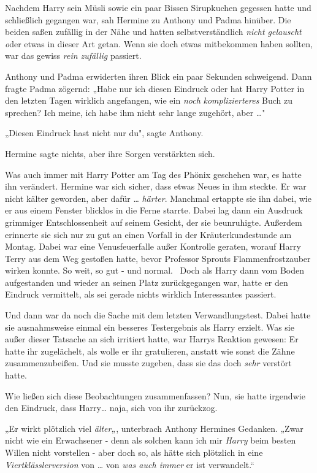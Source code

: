 {Nachdem Harry sein Müsli sowie ein paar Bissen Sirupkuchen gegessen hatte und schließlich gegangen war, sah Hermine zu Anthony und Padma hinüber. Die beiden saßen zufällig in der Nähe und hatten selbstverständlich \emph{nicht gelauscht o}der etwas in dieser Art getan. Wenn sie doch etwas mitbekommen haben sollten, war das gewiss \emph{rein zufällig} passiert.

Anthony und Padma erwiderten ihren Blick ein paar Sekunden schweigend. Dann fragte Padma zögernd: „Habe nur ich diesen Eindruck oder hat Harry Potter in den letzten Tagen wirklich angefangen, wie ein \emph{noch} \emph{komplizierteres} Buch zu sprechen? Ich meine, ich habe ihm nicht sehr lange zugehört, aber …" ~

„Diesen Eindruck hast nicht nur du", sagte Anthony.

Hermine sagte nichts, aber ihre Sorgen verstärkten sich.

Was auch immer mit Harry Potter am Tag des Phönix geschehen war, es hatte ihn verändert. Hermine war sich sicher, dass etwas Neues in ihm steckte. Er war nicht kälter geworden, aber dafür … \emph{härter}. Manchmal ertappte sie ihn dabei, wie er aus einem Fenster blicklos in die Ferne starrte. Dabei lag dann ein Ausdruck grimmiger Entschlossenheit auf seinem Gesicht, der sie beunruhigte. Außerdem erinnerte sie sich nur zu gut an einen Vorfall in der Kräuterkundestunde am Montag. Dabei war eine Venusfeuerfalle außer Kontrolle geraten, worauf Harry Terry aus dem Weg gestoßen hatte, bevor Professor Sprouts Flammenfrostzauber wirken konnte. So weit, so gut - und normal. ~Doch als Harry dann vom Boden aufgestanden und wieder an seinen Platz zurückgegangen war, hatte er den Eindruck vermittelt, als sei gerade nichts wirklich Interessantes passiert.

Und dann war da noch die Sache mit dem letzten Verwandlungstest. Dabei hatte sie ausnahmsweise einmal ein besseres Testergebnis als Harry erzielt. Was sie außer dieser Tatsache an sich irritiert hatte, war Harrys Reaktion gewesen: Er hatte ihr zugelächelt, als wolle er ihr gratulieren, anstatt wie sonst die Zähne zusammenzubeißen. Und sie musste zugeben, dass sie das doch \emph{sehr} verstört hatte.

Wie ließen sich diese Beobachtungen zusammenfassen? Nun, sie hatte irgendwie den Eindruck, dass Harry… naja, sich von ihr zurückzog.

„Er wirkt plötzlich viel \emph{älter}„, unterbrach Anthony Hermines Gedanken. „Zwar nicht wie ein Erwachsener - denn als solchen kann ich mir \emph{Harry} beim besten Willen nicht vorstellen - aber doch so, als hätte sich plötzlich in eine \emph{Viertklässlerversion} von … von \emph{was auch immer} er ist verwandelt.“

}
